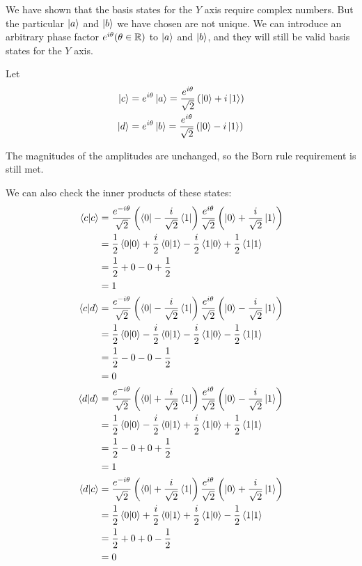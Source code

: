 \documentclass[12pt]{extarticle}
\begin{document}
We have shown that the basis states for the $Y$ axis require complex numbers.
But the particular $\ket{a}$ and $\ket{b}$ we have chosen are not unique.
We can introduce an arbitrary phase factor $e^{i\theta} (\theta\in\mathbb{R})$ to $\ket{a}$ and $\ket{b}$, and they will still be valid basis states for the $Y$ axis.

Let
\begin{align*}
\ket{c} & = e^{i\theta}\ket{a} = \frac{e^{i\theta}}{\sqrt{2}}\left(\ket{0} + i\ket{1}\right) \\
\ket{d} & = e^{i\theta}\ket{b} = \frac{e^{i\theta}}{\sqrt{2}}\left(\ket{0} - i\ket{1}\right)
\end{align*}

The magnitudes of the amplitudes are unchanged, so the Born rule requirement is still met.

We can also check the inner products of these states:
\begin{align*}
\innerproduct{c}{c} & = \frac{e^{-i\theta}}{\sqrt{2}}\left(\bra{0} - \frac{i}{\sqrt{2}}\bra{1}\right) \frac{e^{i\theta}}{\sqrt{2}}\left(\ket{0} + \frac{i}{\sqrt{2}}\ket{1}\right) \\
& = \frac{1}{2}\innerproduct{0}{0} + \frac{i}{2}\innerproduct{0}{1} - \frac{i}{2}\innerproduct{1}{0} + \frac{1}{2}\innerproduct{1}{1} \\
& = \frac{1}{2} + 0 - 0 + \frac{1}{2} \\
& = 1 \\
\innerproduct{c}{d} & = \frac{e^{-i\theta}}{\sqrt{2}}\left(\bra{0} - \frac{i}{\sqrt{2}}\bra{1}\right) \frac{e^{i\theta}}{\sqrt{2}}\left(\ket{0} - \frac{i}{\sqrt{2}}\ket{1}\right) \\
& = \frac{1}{2}\innerproduct{0}{0} - \frac{i}{2}\innerproduct{0}{1} - \frac{i}{2}\innerproduct{1}{0} - \frac{1}{2}\innerproduct{1}{1} \\
& = \frac{1}{2} - 0 - 0 - \frac{1}{2} \\
& = 0 \\
\innerproduct{d}{d} & = \frac{e^{-i\theta}}{\sqrt{2}}\left(\bra{0} + \frac{i}{\sqrt{2}}\bra{1}\right) \frac{e^{i\theta}}{\sqrt{2}}\left(\ket{0} - \frac{i}{\sqrt{2}}\ket{1}\right) \\
& = \frac{1}{2}\innerproduct{0}{0} - \frac{i}{2}\innerproduct{0}{1} + \frac{i}{2}\innerproduct{1}{0} + \frac{1}{2}\innerproduct{1}{1} \\
& = \frac{1}{2} - 0 + 0 + \frac{1}{2} \\
& = 1 \\
\innerproduct{d}{c} & = \frac{e^{-i\theta}}{\sqrt{2}}\left(\bra{0} + \frac{i}{\sqrt{2}}\bra{1}\right) \frac{e^{i\theta}}{\sqrt{2}}\left(\ket{0} + \frac{i}{\sqrt{2}}\ket{1}\right) \\
& = \frac{1}{2}\innerproduct{0}{0} + \frac{i}{2}\innerproduct{0}{1} + \frac{i}{2}\innerproduct{1}{0} - \frac{1}{2}\innerproduct{1}{1} \\
& = \frac{1}{2} + 0 + 0 - \frac{1}{2} \\
& = 0
\end{align*}
\end{document}
